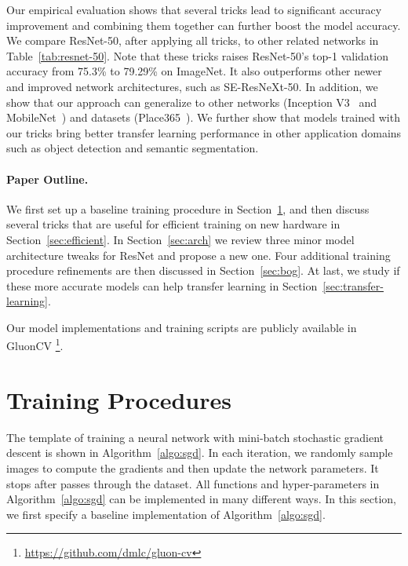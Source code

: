 \documentclass[10pt,twocolumn,letterpaper]{article}
\begin{document}
Our empirical evaluation shows that several tricks lead to significant accuracy improvement and combining them together can further boost the model accuracy.
We compare ResNet-50, after applying all tricks, to other related networks in Table~\ref{tab:resnet-50}. 
Note that these tricks raises ResNet-50's top-1 validation accuracy from 75.3\% to 79.29\% on ImageNet.
It also outperforms other newer and improved network architectures, such as SE-ResNeXt-50.
In addition, we show that our approach can generalize to other networks (Inception
V3~\cite{DBLP:journals/corr/ChenPSA17} and MobileNet~\cite{howard2017mobilenets}) and datasets (Place365~\cite{zhou2017places}). We further show that models trained with our tricks bring better transfer learning performance in other application domains such as object detection and semantic segmentation.






\paragraph{Paper Outline.} We first set up a baseline training procedure in
Section~\ref{sec:training-procedure}, and then discuss several tricks that are
useful for efficient training on new hardware in Section~\ref{sec:efficient}. In
Section~\ref{sec:arch} we review three minor model architecture tweaks for ResNet and propose a
new one. Four additional training procedure refinements are then discussed in
Section~\ref{sec:bog}. At last, we study if these more accurate models can help
transfer learning in Section~\ref{sec:transfer-learning}.

Our model implementations and training scripts are publicly available in GluonCV \footnote{\url{https://github.com/dmlc/gluon-cv}}.

\section{Training Procedures}
\label{sec:training-procedure}

The template of training a neural network with mini-batch stochastic gradient
descent is shown in Algorithm~\ref{algo:sgd}. In each iteration, we randomly sample 
images to compute the gradients and then update the network parameters. It stops
after  passes through the dataset. 
All functions and hyper-parameters in Algorithm~\ref{algo:sgd} can be implemented in many different ways. 
In this section, we first specify a baseline implementation of
Algorithm~\ref{algo:sgd}.
\end{document}
